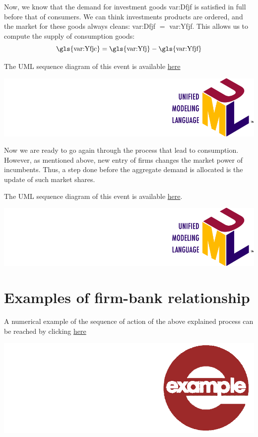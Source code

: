 \documentclass{book}
\newcommand{\doclocation}{file:///Users/giulioni/Documents/workspace/gabriele/docs}
\begin{document}
\vskip2mm
Now, we know that the demand for investment goods \gls{var:Dfjf} is satisfied in full before that of consumers. We can think investments products are ordered, and the market for these goods always cleans: \gls{var:Dfjf} $=$ \gls{var:Yfjf}. This allows us to compute the supply of consumption goods:
\[
	\textnormal{\gls{var:Yfjc}}=\textnormal{\gls{var:Yfj}}-\textnormal{\gls{var:Yfjf}}
\]


\vskip3mm
The UML sequence diagram of this event is available \href{\doclocation/umldoc/makeProduction.html}{here}
\begin{marginfigure}
	\includegraphics[scale=0.1]{uml.png}
\end{marginfigure}
\vskip3mm



Now we are ready to go again through the process that lead to consumption. However, as mentioned above, new entry of firms changes the market power of incumbents. Thus, a step done before the aggregate demand is allocated is the update of such market shares.   


\vskip3mm
The UML sequence diagram of this event is available \href{\doclocation/umldoc/setupNewFirmsToComputeProductAttractiveness.html}{here}.
\begin{marginfigure}
	\includegraphics[scale=0.1]{uml.png}
\end{marginfigure}
\vskip3mm


\section*{Examples of firm-bank relationship}

A numerical example of the sequence of action of the above explained process can be reached by clicking \href{\doclocation/umldoc/example_firm_bad_conditions.html}{here}
\begin{marginfigure}
\hskip8mm	\includegraphics[scale=0.07]{example.png}
\end{marginfigure}
\end{document}
